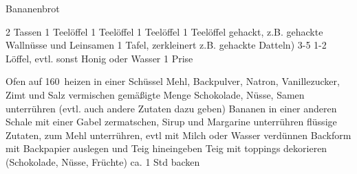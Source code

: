 \begin{recipe}{Bananenbrot}

     2 Tassen
     1 Teelöffel
     1 Teelöffel
     1 Teelöffel
     1 Teelöffel 
     gehackt, z.B. gehackte Wallnüsse und Leinsamen
     1 Tafel, zerkleinert
     z.B. gehackte Datteln)
     3-5
     1-2 Löffel, evtl. sonst Honig
     oder Wasser
     1 Prise
    \ingredient{}
    \ingredient{}

    \fivestar
    \ingredient{}
    \ingredient{}

     Ofen auf 160\textdegree\ heizen
     in einer Schüssel Mehl, Backpulver, Natron, Vanillezucker, Zimt und Salz vermischen
     gemäßigte Menge Schokolade, Nüsse, Samen unterrühren (evtl. auch andere Zutaten dazu geben)
     Bananen in einer anderen Schale mit einer Gabel zermatschen, Sirup und Margarine unterrühren
     flüssige Zutaten, zum Mehl unterrühren, evtl mit Milch oder Wasser verdünnen
     Backform mit Backpapier auslegen und Teig hineingeben
     Teig mit toppings dekorieren (Schokolade, Nüsse, Früchte)
     ca. 1 Std backen

\end{recipe}
